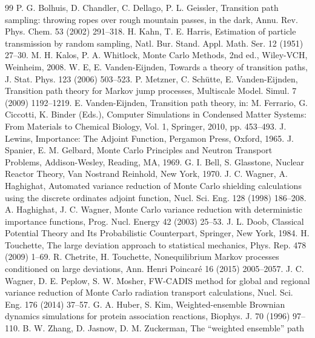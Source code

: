 \documentclass[a4paper,fleqn]{cas-sc}
\begin{document}
\begin{thebibliography}{99}
 P. G. Bolhuis, D. Chandler, C. Dellago, P. L. Geissler, Transition path
sampling: throwing ropes over rough mountain passes, in the dark, Annu. Rev. Phys. Chem. 53 (2002)
291--318.
 H. Kahn, T. E. Harris, Estimation of particle transmission by random sampling,
Natl. Bur. Stand. Appl. Math. Ser. 12 (1951) 27--30.
 M. H. Kalos, P. A. Whitlock, Monte Carlo Methods, 2nd ed., Wiley-VCH,
Weinheim, 2008.
 W. E, E. Vanden-Eijnden, Towards a theory of transition paths, J. Stat. Phys. 123
(2006) 503--523.
 P. Metzner, C. Sch\"utte, E. Vanden-Eijnden, Transition path theory for
Markov jump processes, Multiscale Model. Simul. 7 (2009) 1192--1219.
 E. Vanden-Eijnden, Transition path theory, in: M. Ferrario,
G. Ciccotti, K. Binder (Eds.), Computer Simulations in Condensed Matter Systems: From Materials to
Chemical Biology, Vol. 1, Springer, 2010, pp. 453--493.
 J. Lewins, Importance: The Adjoint Function, Pergamon Press, Oxford, 1965.
 J. Spanier, E. M. Gelbard, Monte Carlo Principles and Neutron Transport
Problems, Addison-Wesley, Reading, MA, 1969.
 G. I. Bell, S. Glasstone, Nuclear Reactor Theory, Van Nostrand Reinhold,
New York, 1970.
 J. C. Wagner, A. Haghighat, Automated variance reduction of Monte Carlo
shielding calculations using the discrete ordinates adjoint function, Nucl. Sci. Eng. 128 (1998)
186--208.
 A. Haghighat, J. C. Wagner, Monte Carlo variance reduction with
deterministic importance functions, Prog. Nucl. Energy 42 (2003) 25--53.
 J. L. Doob, Classical Potential Theory and Its Probabilistic Counterpart,
Springer, New York, 1984.
 H. Touchette, The large deviation approach to statistical mechanics,
Phys. Rep. 478 (2009) 1--69.
 R. Chetrite, H. Touchette, Nonequilibrium Markov processes conditioned on
large deviations, Ann. Henri Poincar\'e 16 (2015) 2005--2057.
 J. C. Wagner, D. E. Peplow, S. W. Mosher, FW-CADIS method for global and
regional variance reduction of Monte Carlo radiation transport calculations, Nucl. Sci. Eng. 176
(2014) 37--57.
 G. A. Huber, S. Kim, Weighted-ensemble Brownian dynamics simulations for
protein association reactions, Biophys. J. 70 (1996) 97--110.
 B. W. Zhang, D. Jasnow, D. M. Zuckerman, The ``weighted ensemble'' path

\end{thebibliography}
\end{document}
